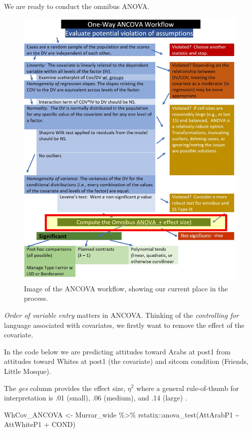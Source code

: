 \documentclass[
  11pt,
]{book}
\newenvironment{Shaded}{\begin{snugshade}}{\end{snugshade}}
\newcommand{\FunctionTok}[1]{\textcolor[rgb]{0.00,0.00,0.00}{#1}}
\newcommand{\NormalTok}[1]{#1}
\newcommand{\OtherTok}[1]{\textcolor[rgb]{0.56,0.35,0.01}{#1}}
\newcommand{\SpecialCharTok}[1]{\textcolor[rgb]{0.00,0.00,0.00}{#1}}
\begin{document}
We are ready to conduct the omnibus ANOVA.

\begin{figure}
\centering
\includegraphics{images/ANCOVA/wf_ANCOVA_omnibus.jpg}
\caption{Image of the ANCOVA workflow, showing our current place in the process.}
\end{figure}

\emph{Order of variable entry} matters in ANCOVA. Thinking of the \emph{controlling for} language associated with covariates, we firstly want to remove the effect of the covariate.

In the code below we are predicting attitudes toward Arabs at post1 from attitudes toward Whites at post1 (the covariate) and sitcom condition (Friends, Little Mosque).

The \emph{ges} column provides the effect size, \(\eta^2\) where a general rule-of-thumb for interpretation is .01 (small), .06 (medium), and .14 (large) \citep{lakens_calculating_2013}.

\begin{Shaded}
\begin{Highlighting}[]
\NormalTok{WhCov\_ANCOVA }\OtherTok{\textless{}{-}}\NormalTok{ Murrar\_wide }\SpecialCharTok{\%\textgreater{}\%}
\NormalTok{    rstatix}\SpecialCharTok{::}\FunctionTok{anova\_test}\NormalTok{(AttArabP1 }\SpecialCharTok{\textasciitilde{}}\NormalTok{ AttWhiteP1 }\SpecialCharTok{+}\NormalTok{ COND)}
\end{Highlighting}
\end{Shaded}
\end{document}

